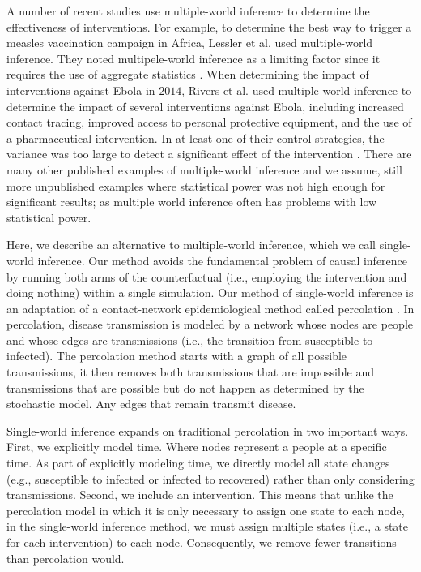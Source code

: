 \documentclass[openacc]{rsproca_new}%
\begin{document}
A number of recent studies use multiple-world inference to determine the effectiveness of interventions.
For example, to determine the best way to trigger a measles vaccination campaign in Africa, Lessler et al. used multiple-world inference.
They noted multipele-world inference as a limiting factor since it requires the use of aggregate statistics \cite{lessler-et-al:2016}.
When determining the impact of interventions against Ebola in $2014$, Rivers et al. used multiple-world inference to determine the impact of several interventions against Ebola, including increased contact tracing, improved access to personal protective equipment, and the use of a pharmaceutical intervention. 
In at least one of their control strategies, the variance was too large to detect a significant effect of the intervention \cite{rivers-et-al:2014}.
There are many other published examples of multiple-world inference and we assume, still more unpublished examples where statistical power was not high enough for significant results; as multiple world inference often has problems with low statistical power.

Here, we describe an alternative to multiple-world inference, which we call single-world inference.
Our method avoids the fundamental problem of causal inference by running both arms of the counterfactual (i.e., employing the intervention and doing nothing) within a single simulation.
Our method of single-world inference is an adaptation of a contact-network epidemiological method called percolation \cite{miller-book}.
In percolation, disease transmission is modeled by a network whose nodes are people and whose edges are transmissions (i.e., the transition from susceptible to infected).
The percolation method starts with a graph of all possible transmissions, it then removes both transmissions that are impossible and transmissions that are possible but do not happen as determined by the stochastic model.
Any edges that remain transmit disease.

Single-world inference expands on traditional percolation in two important ways.
First, we explicitly model time. Where nodes represent a people at a specific time.
As part of explicitly modeling time, we directly model all state changes (e.g., susceptible to infected or infected to recovered) rather than only considering transmissions.
Second, we include an intervention.
This means that unlike the percolation model in which it is only necessary to assign one state to each node, in the single-world inference method, we must assign multiple states (i.e., a state for each intervention) to each node.
Consequently, we remove fewer transitions than percolation would.
\end{document}

